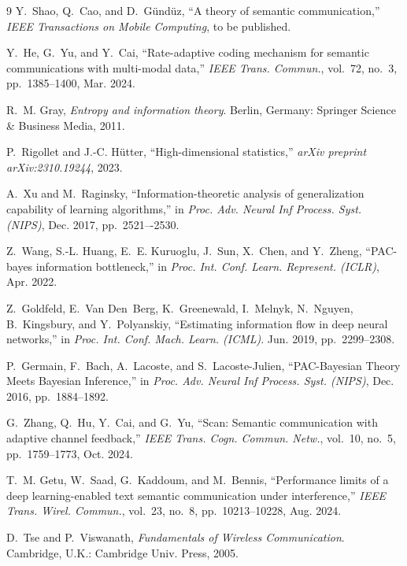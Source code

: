 \documentclass[lettersize,journal]{IEEEtran}
\theoremstyle{definition}
\theoremstyle{plain}
\begin{document}
\begin{thebibliography}{9}
Y.~Shao, Q.~Cao, and D.~Gündüz, ``A theory of semantic communication,'' \emph{IEEE Transactions on Mobile Computing}, to be published.

Y.~He, G.~Yu, and Y.~Cai, ``Rate-adaptive coding mechanism for semantic communications with multi-modal data,'' \emph{IEEE Trans. Commun.}, vol.~72, no.~3, pp.~1385--1400, Mar. 2024.

R.~M. Gray, \emph{Entropy and information theory}. Berlin, Germany: Springer Science \& Business Media, 2011.

P.~Rigollet and J.-C. H{\"u}tter, ``High-dimensional statistics,'' \emph{arXiv preprint arXiv:2310.19244}, 2023.

A.~Xu and M.~Raginsky, ``Information-theoretic analysis of generalization capability of learning algorithms,'' in \emph{Proc. Adv. Neural Inf Process. Syst. (NIPS)}, Dec. 2017, pp.~2521–-2530.

Z.~Wang, S.-L. Huang, E.~E. Kuruoglu, J.~Sun, X.~Chen, and Y.~Zheng, ``{PAC}-bayes information bottleneck,'' in \emph{Proc. Int. Conf. Learn. Represent. (ICLR)}, Apr. 2022.


Z.~Goldfeld, E.~Van Den~Berg, K.~Greenewald, I.~Melnyk, N.~Nguyen, B.~Kingsbury, and Y.~Polyanskiy, ``Estimating information flow in deep neural networks,'' in \emph{Proc. Int. Conf. Mach. Learn. (ICML)}. Jun. 2019, pp.~2299--2308.

P.~Germain, F.~Bach, A.~Lacoste, and S.~Lacoste-Julien, ``PAC-Bayesian Theory Meets Bayesian Inference,'' in \emph{Proc. Adv. Neural Inf Process. Syst. (NIPS)}, Dec. 2016, pp.~1884--1892.


G.~Zhang, Q.~Hu, Y.~Cai, and G.~Yu, ``Scan: Semantic communication with adaptive channel feedback,'' \emph{IEEE Trans. Cogn. Commun. Netw.}, vol.~10, no.~5, pp.~1759--1773, Oct. 2024.

T.~M. Getu, W.~Saad, G.~Kaddoum, and M.~Bennis, ``Performance limits of a deep learning-enabled text semantic communication under interference,'' \emph{IEEE Trans. Wirel. Commun.}, vol.~23, no.~8, pp.~10213--10228, Aug. 2024.

D.~Tse and P.~Viswanath, \emph{Fundamentals of Wireless Communication}. Cambridge, U.K.: Cambridge Univ. Press, 2005.


\end{thebibliography}
\end{document}
